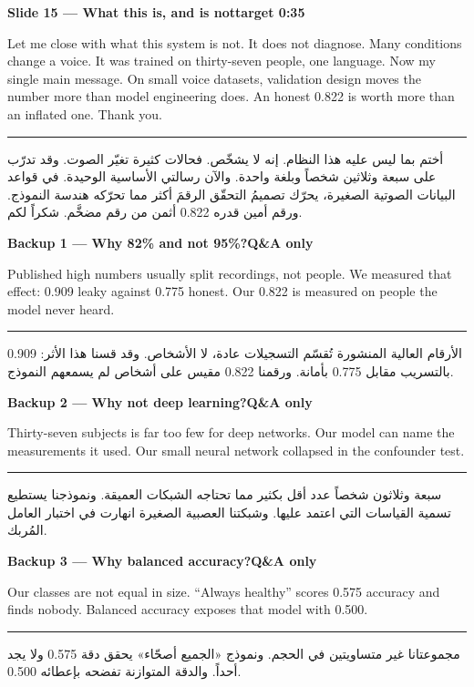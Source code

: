 \documentclass[12pt,a4paper]{article}
\newcommand{\slidehead}[2]{%
\noindent\colorbox{honest!10}{\parbox{\dimexpr\textwidth-2\fboxsep}{%
\textbf{#1}\hfill\textbf{#2}}}\par\vspace{4pt}}
\newcommand{\arstart}{\par\vspace{6pt}\hrule\vspace{6pt}}
\begin{document}
\slidehead{Slide 15 --- What this is, and is not}{target 0:35}
Let me close with what this system is not.
It does not diagnose. Many conditions change a voice.
It was trained on thirty-seven people, one language.
Now my single main message.
On small voice datasets, validation design moves the number
more than model engineering does.
An honest \textcolor{honest}{0.822} is worth more than an inflated one.
Thank you.
\arstart
\begin{Arabic}
أختم بما ليس عليه هذا النظام.
إنه لا يشخّص. فحالات كثيرة تغيّر الصوت.
وقد تدرّب على سبعة وثلاثين شخصاً وبلغة واحدة.
والآن رسالتي الأساسية الوحيدة.
في قواعد البيانات الصوتية الصغيرة، يحرّك تصميمُ التحقّق الرقمَ
أكثر مما تحرّكه هندسة النموذج.
ورقم أمين قدره \textenglish{0.822} أثمن من رقم مضخَّم.
شكراً لكم.
\end{Arabic}
\clearpage

\slidehead{Backup 1 --- Why 82\% and not 95\%?}{Q\&A only}
Published high numbers usually split recordings, not people.
We measured that effect: 0.909 leaky against 0.775 honest.
Our 0.822 is measured on people the model never heard.
\arstart
\begin{Arabic}
الأرقام العالية المنشورة تُقسّم التسجيلات عادة، لا الأشخاص.
وقد قسنا هذا الأثر: \textenglish{0.909} بالتسريب مقابل \textenglish{0.775} بأمانة.
ورقمنا \textenglish{0.822} مقيس على أشخاص لم يسمعهم النموذج.
\end{Arabic}
\clearpage

\slidehead{Backup 2 --- Why not deep learning?}{Q\&A only}
Thirty-seven subjects is far too few for deep networks.
Our model can name the measurements it used.
Our small neural network collapsed in the confounder test.
\arstart
\begin{Arabic}
سبعة وثلاثون شخصاً عدد أقل بكثير مما تحتاجه الشبكات العميقة.
ونموذجنا يستطيع تسمية القياسات التي اعتمد عليها.
وشبكتنا العصبية الصغيرة انهارت في اختبار العامل المُربك.
\end{Arabic}
\clearpage

\slidehead{Backup 3 --- Why balanced accuracy?}{Q\&A only}
Our classes are not equal in size.
``Always healthy'' scores 0.575 accuracy and finds nobody.
Balanced accuracy exposes that model with 0.500.
\arstart
\begin{Arabic}
مجموعتانا غير متساويتين في الحجم.
ونموذج «الجميع أصحّاء» يحقق دقة \textenglish{0.575} ولا يجد أحداً.
والدقة المتوازنة تفضحه بإعطائه \textenglish{0.500}.
\end{Arabic}
\clearpage
\end{document}

